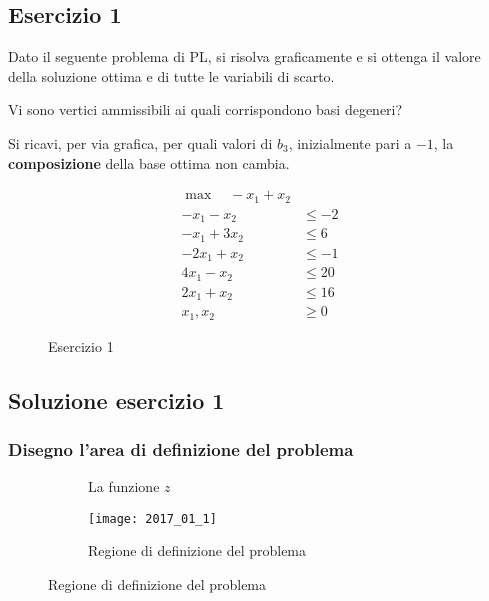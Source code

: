 \documentclass[\main/main.tex]{subfiles}
\begin{document}
\subsection{Esercizio 1}
Dato il seguente problema di PL, si risolva graficamente e si ottenga il valore della soluzione ottima e di tutte le variabili di scarto.

Vi sono vertici ammissibili ai quali corrispondono basi degeneri?

Si ricavi, per via grafica, per quali valori di $b_3$, inizialmente pari a $-1$, la \textbf{composizione} della base ottima non cambia.

\begin{figure}
  \begin{align*}
    \max \quad -x_1 + x_2 \\
    -x_1 -x_2   & \leq -2 \\
    -x_1 + 3x_2 & \leq 6  \\
    -2x_1 + x_2 & \leq -1 \\
    4x_1 - x_2  & \leq 20 \\
    2x_1 + x_2  & \leq 16 \\
    x_1, x_2    & \geq 0
  \end{align*}
  \caption{Esercizio 1}
\end{figure}

\subsection{Soluzione esercizio 1}
\subsubsection*{Disegno l'area di definizione del problema}
\begin{figure}
  \begin{subfigure}{0.45\textwidth}
    \caption{La funzione $z$}
  \end{subfigure}
  \begin{subfigure}{0.45\textwidth}
    \texttt{[image: 2017\_01\_1]}
    \caption{Regione di definizione del problema}
  \end{subfigure}
\end{figure}
\end{document}
